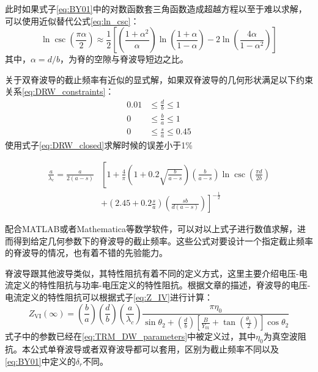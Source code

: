 \documentclass[master]{thesis-uestc}
\begin{document}
此时如果式子\ref{eq:BY01}中的对数函数套三角函数造成超越方程以至于难以求解，可以使用近似替代公式\ref{eq:ln_csc}：
\begin{equation}
    \ln \csc \left( \frac{\pi \alpha}{2} \right) \approx \frac{1}{2} \left[ \left( \frac{1 + \alpha^2}{\alpha} \right) \ln \left( \frac{1 + \alpha}{1 - \alpha} \right) - 2 \ln \left( \frac{4 \alpha}{1 - \alpha^2} \right) \right] \label{eq:ln_csc}
\end{equation}
其中，$\alpha=d/b$，为脊的空隙与脊波导短边之比。

关于双脊波导的截止频率有近似的显式解，如果双脊波导的几何形状满足以下约束关系\ref{eq:DRW_constraints}：
\begin{equation}\label{eq:DRW_constraints}
    \begin{aligned}
    0.01 &\leq \frac{d}{b} \leq 1 \\
    0 &\leq \frac{b}{a} \leq 1 \\
    0 &\leq \frac{s}{a} \leq 0.45
    \end{aligned}
\end{equation}
使用式子\ref{eq:DRW_closed}求解时候的误差小于1\%

\begin{equation}\label{eq:DRW_closed}
    \begin{split}
        \frac{a}{\lambda_c} = \frac{a}{2(a - s)} & \left[ 1 + \frac{4}{\pi} \left( 1 + 0.2 \sqrt{\frac{b}{a - s}} \right) \left( \frac{b}{a - s} \right) \ln \csc \left( \frac{\pi d}{2b} \right) \right. \\
        & \left. + \left( 2.45 + 0.2 \frac{s}{a} \right) \left( \frac{sb}{d(a - s)} \right) \right]^{-\frac{1}{2}}
    \end{split}
\end{equation}

配合MATLAB或者Mathematica等数学软件，可以对以上式子进行数值求解，进而得到给定几何参数下的脊波导的截止频率。这些公式对要设计一个指定截止频率的脊波导的情况，也有着不错的先验能力。

脊波导跟其他波导类似，其特性阻抗有着不同的定义方式，这里主要介绍电压-电流定义的特性阻抗与功率-电压定义的特性阻抗。根据文章\cite{Hoefer1982AnalyticalEF}的描述，脊波导的电压-电流定义的特性阻抗可以根据式子\ref{eq:Z_IV}进行计算：
\begin{equation}\label{eq:Z_IV}
    Z_{\mathrm{VI}}(\infty) = \left( \frac{b}{a} \right) \left( \frac{d}{b} \right) \left( \frac{a}{\lambda_c} \right) \frac{\pi \eta_0}{\sin \theta_2 + \left( \frac{d}{b} \right) \left[ \frac{B}{Y_{01}} + \tan \left( \frac{\theta_1}{2} \right) \right] \cos \theta_2}
\end{equation}
式子中的参数已经在\ref{eq:TRM_DW_parameters}中被定义过，其中$\eta_0$为真空波阻抗。本公式单脊波导或者双脊波导都可以套用，区别为截止频率不同以及\ref{eq:BY01}中定义的$\delta_{r}$不同。
\end{document}
